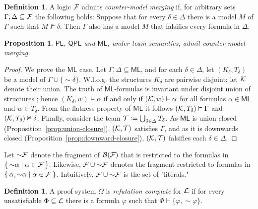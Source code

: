\documentclass[a4paper,english,fleqn,11pt,final]{scrartcl}
\makeatletter
\newcommand{\Wloss}{W.l.o.g.\@\xspace}
\newcommand{\negg}{{\sim}}
\newcommand{\logic}[1]{\ensuremath{\mathsf{#1}}\xspace}
\newcommand{\PL}{\logic{PL}}
\newcommand{\QPL}{\logic{QPL}}
\newcommand{\ML}{\logic{ML}}
\newcommand{\calB}{\protect\ensuremath{\mathcal{B}}}
\newcommand{\calF}{\protect\ensuremath{\mathcal{F}}}
\newcommand{\calL}{\protect\ensuremath{\mathcal{L}}}
\newcommand{\calK}{\protect\ensuremath{\mathcal{K}}}
\newcommand{\calT}{\protect\ensuremath{\mathcal{T}}}
\providecommand{\dfn}{\mathrel{\mathop:}=}
\theoremstyle{plain}
\newtheorem{proposition}[theorem]{Proposition}
\theoremstyle{definition}
\newtheorem{definition}[theorem]{Definition}
\makeatother
\begin{document}
\begin{definition}
A logic $\calF$ admits \emph{counter-model merging} if, for arbitrary sets $\Gamma,\Delta \subseteq \calF$ the following holds:
Suppose that for every $\delta \in \Delta$ there is a model $M$ of $\Gamma$ such that $M \nvDash \delta$.
Then $\Gamma$ also has a model $M$ that falsifies every formula in $\Delta$.
\end{definition}

\begin{proposition}\label{prop:counter-models-ml-pl}
$\PL$, $\QPL$ and $\ML$, under team semantics, admit counter-model merging.
\end{proposition}
\begin{proof}
We prove the $\ML$ case.
Let $\Gamma, \Delta \subseteq \ML$, and for each $\delta \in \Delta$, let $(K_\delta, T_\delta)$ be a model of $\Gamma \cup \{\negg \delta\}$.
\Wloss the structures $K_\delta$ are pairwise disjoint; let $\calK$ denote their union.
The truth of $\ML$-formulas is invariant under disjoint union of structures \cite{Goranko2007249}; hence $(K_\delta,w) \vDash \alpha$ if and only if $(\calK,w) \vDash \alpha$ for all formulas $\alpha \in \ML$ and $w \in T_\delta$.
From the flatness property of $\ML$ it follows $(\calK,T_\delta) \vDash \Gamma$ and $(\calK,T_\delta) \nvDash \delta$.
Finally, consider the team $\calT \dfn \bigcup_{\delta \in \Delta} T_\delta$.
As $\ML$ is union closed (Proposition~\ref{prop:union-closure}), $(\calK,\calT)$ satisfies $\Gamma$, and as it is downwards closed (Proposition~\ref{prop:downward-closure}), $(\calK,\calT)$ falsifies each $\delta \in \Delta$.
\end{proof}



Let $\negg \calF$ denote the fragment of $\calB(\calF)$ that is restricted to the formulas in $\Set{ \negg \alpha | \alpha \in \calF }$.
Likewise, $\calF \cup \negg \calF$ denotes the fragment restricted to formulas in $\Set{\alpha,\negg\alpha | \alpha \in \calF}$.
Intuitively, $\calF \cup \negg \calF$ is the set of "literals."


\begin{definition}
A proof system $\Omega$ is \emph{refutation complete} for $\calL$ if for every unsatisfiable $\Phi \subseteq \calL$ there is a formula $\varphi$ such that $\Phi \vdash \{\varphi, \negg\varphi\}$.
\end{definition}
\end{document}
